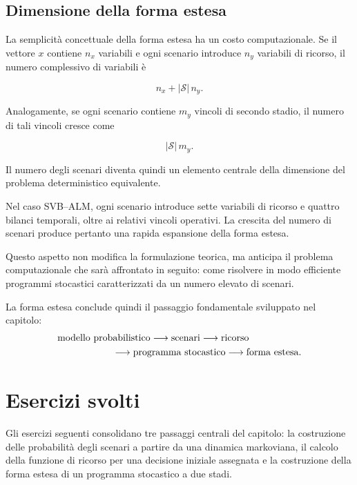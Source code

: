 \subsection{Dimensione della forma estesa}

La semplicit\`a concettuale della forma estesa ha un costo computazionale.
Se il vettore $x$ contiene $n_x$ variabili e ogni scenario introduce
$n_y$ variabili di ricorso, il numero complessivo di variabili \`e

\[
n_x+|\mathcal S|\,n_y.
\]

Analogamente, se ogni scenario contiene $m_y$ vincoli di secondo stadio,
il numero di tali vincoli cresce come

\[
|\mathcal S|\,m_y.
\]

Il numero degli scenari diventa quindi un elemento centrale della dimensione
del problema deterministico equivalente.

Nel caso SVB--ALM, ogni scenario introduce sette variabili di ricorso e
quattro bilanci temporali, oltre ai relativi vincoli operativi. La crescita
del numero di scenari produce pertanto una rapida espansione della forma
estesa.

Questo aspetto non modifica la formulazione teorica, ma anticipa il problema
computazionale che sar\`a affrontato in seguito: come risolvere
in modo efficiente programmi stocastici caratterizzati da un numero elevato
di scenari.

La forma estesa conclude quindi il passaggio fondamentale sviluppato nel
capitolo:
\[
\begin{aligned}
&\text{modello probabilistico}
\longrightarrow
\text{scenari}
\longrightarrow
\text{ricorso}
\\
&\hspace{2.0cm}
\longrightarrow
\text{programma stocastico}
\longrightarrow
\text{forma estesa}.
\end{aligned}
\]

\section{Esercizi svolti}

\label{sec:cap14-esercizi-svolti}

Gli esercizi seguenti consolidano tre passaggi centrali del capitolo: la
costruzione delle probabilit\`a degli scenari a partire da una dinamica
markoviana, il calcolo della funzione di ricorso per una decisione iniziale
assegnata e la costruzione della forma estesa di un programma stocastico a
due stadi.

